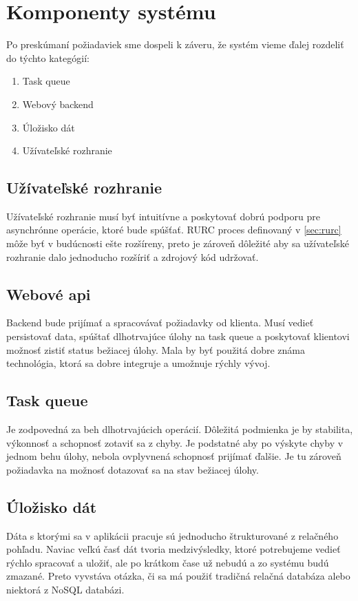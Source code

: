 \section{Komponenty systému}
Po preskúmaní požiadaviek sme dospeli k záveru, že systém vieme ďalej rozdeliť do týchto kategógií:

\begin{enumerate}
  \item Task queue
  \item Webový backend
  \item Úložisko dát
  \item Užívateľské rozhranie
\end{enumerate}

\subsection{Užívateľské rozhranie}
Užívateľské rozhranie musí byť intuitívne a poskytovať dobrú podporu pre asynchrónne operácie, ktoré bude spúšťať. RURC proces definovaný v \ref{sec:rurc} môže byť v budúcnosti ešte rozšíreny, preto je zároveň dôležité aby sa užívateľské rozhranie dalo jednoducho rozšíriť a zdrojový kód udržovať.

\subsection{Webové api}
Backend bude prijímať a spracovávať požiadavky od klienta. Musí vedieť persistovať data, spúštať dlhotrvajúce úlohy na task queue a poskytovať klientovi možnosť zistiť status bežiacej úlohy. Mala by byť použitá dobre známa technológia, ktorá sa dobre integruje a umožnuje rýchly vývoj.

\subsection{Task queue}
Je zodpovedná za beh dlhotrvajúcich operácií. Dôležitá podmienka je by stabilita, výkonnosť a schopnosť zotaviť sa z chyby. Je podstatné aby po výskyte chyby v jednom behu úlohy, nebola ovplyvnená schopnosť prijímať ďalšie. Je tu zároveň požiadavka na možnosť dotazovať sa na stav bežiacej úlohy.

\subsection{Úložisko dát}
Dáta s ktorými sa v aplikácii pracuje sú jednoducho štrukturované z relačného pohľadu. Naviac veľkú časť dát tvoria medzivýsledky, ktoré potrebujeme vedieť rýchlo spracovať a uložiť, ale po krátkom čase už nebudú a zo systému budú zmazané. Preto vyvstáva otázka, či sa má použiť tradičná relačná databáza alebo niektorá z NoSQL databázi. 

